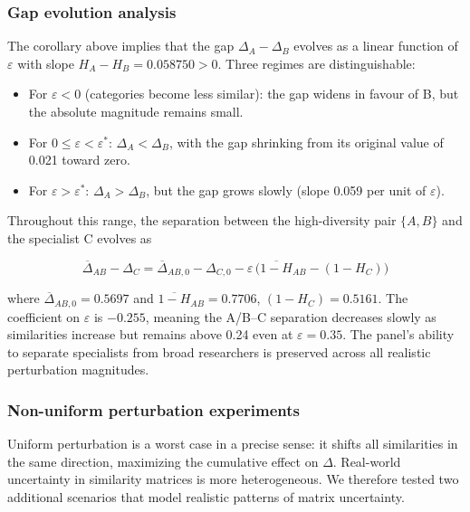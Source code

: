 \documentclass[
]{article}
\providecommand{\tightlist}{%
  \setlength{\itemsep}{0pt}\setlength{\parskip}{0pt}}
\begin{document}
\hypertarget{gap-evolution-analysis}{%
\subsubsection{Gap evolution analysis}\label{gap-evolution-analysis}}

The corollary above implies that the gap \(\Delta_A - \Delta_B\) evolves
as a linear function of \(\varepsilon\) with slope
\(H_A - H_B = 0.058750 > 0\). Three regimes are distinguishable:

\begin{itemize}
\tightlist
\item
  For \(\varepsilon < 0\) (categories become less similar): the gap
  widens in favour of B, but the absolute magnitude remains small.
\item
  For \(0 \le \varepsilon < \varepsilon^*\): \(\Delta_A < \Delta_B\),
  with the gap shrinking from its original value of 0.021 toward zero.
\item
  For \(\varepsilon > \varepsilon^*\): \(\Delta_A > \Delta_B\), but the
  gap grows slowly (slope 0.059 per unit of \(\varepsilon\)).
\end{itemize}

Throughout this range, the separation between the high-diversity pair
\(\{A, B\}\) and the specialist C evolves as

\[\overline{\Delta}_{AB} - \Delta_C = \overline{\Delta}_{AB,0} - \Delta_{C,0}
  - \varepsilon\,\bigl(\overline{1-H}_{AB} - (1-H_C)\bigr)\]

where \(\overline{\Delta}_{AB,0} = 0.5697\) and
\(\overline{1-H}_{AB} = 0.7706\), \((1-H_C) = 0.5161\). The coefficient
on \(\varepsilon\) is \(-0.255\), meaning the A/B--C separation
decreases slowly as similarities increase but remains above 0.24 even at
\(\varepsilon = 0.35\). The panel's ability to separate specialists from
broad researchers is preserved across all realistic perturbation
magnitudes.

\hypertarget{non-uniform-perturbation-experiments}{%
\subsubsection{Non-uniform perturbation
experiments}\label{non-uniform-perturbation-experiments}}

Uniform perturbation is a worst case in a precise sense: it shifts all
similarities in the same direction, maximizing the cumulative effect on
\(\Delta\). Real-world uncertainty in similarity matrices is more
heterogeneous. We therefore tested two additional scenarios that model
realistic patterns of matrix uncertainty.
\end{document}
